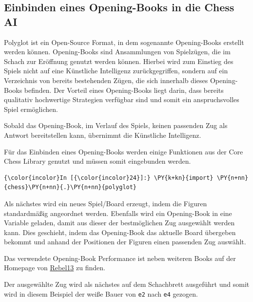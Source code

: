     \subsection{Einbinden eines Opening-Books in die Chess
AI}\label{einbinden-eines-opening-books-in-die-chess-ai}

Polyglot ist ein Open-Source Format, in dem sogenannte Opening-Books
erstellt werden können. Opening-Books sind Ansammlungen von Spielzügen,
die im Schach zur Eröffnung genutzt werden können. Hierbei wird zum
Einstieg des Spiels nicht auf eine Künstliche Intelligenz
zurückgegriffen, sondern auf ein Verzeichnis von bereits bestehenden
Zügen, die sich innerhalb dieses Opening-Books befinden. Der Vorteil
eines Opening-Books liegt darin, dass bereits qualitativ hochwertige
Strategien verfügbar sind und somit ein anspruchsvolles Spiel
ermöglichen.

Sobald das Opening-Book, im Verlauf des Spiels, keinen passenden Zug als
Antwort bereitstellen kann, übernimmt die Künstliche Intelligenz.

Für das Einbinden eines Opening-Books werden einige Funktionen aus der
Core Chess Library genutzt und müssen somit eingebunden werden.

    \begin{Verbatim}[commandchars=\\\{\}]
{\color{incolor}In [{\color{incolor}24}]:} \PY{k+kn}{import} \PY{n+nn}{chess}\PY{n+nn}{.}\PY{n+nn}{polyglot}
\end{Verbatim}


    Als nächstes wird ein neues Spiel/Board erzeugt, indem die Figuren
standardmäßig angeordnet werden. Ebenfalls wird ein Opening-Book in eine
Variable geladen, damit aus dieser der bestmöglichen Zug ausgewählt
werden kann. Dies geschieht, indem das Opening-Book das aktuelle Board
übergeben bekommt und anhand der Positionen der Figuren einen passenden
Zug auswählt.

Das verwendete Opening-Book Performance ist neben weiteren Books auf der Homepage
von \href{http://rebel13.nl/download/books.html}{Rebel13} zu finden.


Der ausgewählte Zug wird als nächstes auf dem Schachbrett ausgeführt und
somit wird in diesem Beispiel der weiße Bauer von \texttt{e2} nach
\texttt{e4} gezogen.

